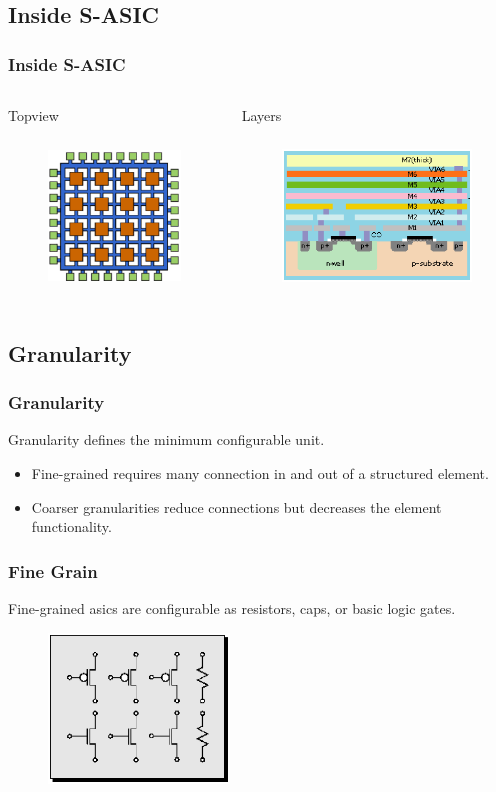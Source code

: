 \documentclass{beamer}
\begin{document}
\subsection{Inside S-ASIC}
\frame
{
  \frametitle{Inside S-ASIC}
  \begin{columns}
  \begin{column}[l]{5cm}
  Topview
  \begin{figure}[H]
  \includegraphics[height=40mm]{images/structured.eps}
  \end{figure}
  \end{column}
  \begin{column}[r]{5cm}
  Layers
  \begin{figure}[H]
  \includegraphics[height=40mm]{images/inside2.eps}
  \end{figure}
  \end{column}
  \end{columns}
}

\subsection{Granularity}
\frame
{
  \frametitle{Granularity}
  Granularity defines the minimum configurable unit.
  \begin{itemize}
  \item Fine-grained requires many connection in and out of a structured element.
  \item Coarser granularities reduce connections but decreases the element functionality. 
  \end{itemize}
}

\frame
{
  \frametitle{Fine Grain}
  Fine-grained asics are configurable as resistors, caps, or basic logic gates.
  \begin{figure}[H]
  \includegraphics[height=40mm]{images/fine_grained.eps}
  \end{figure}
}
\end{document}
